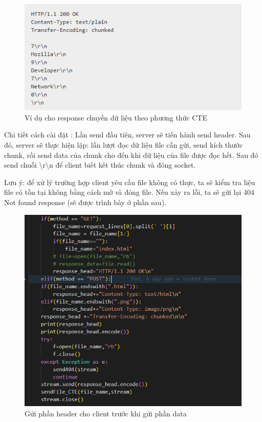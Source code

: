 \documentclass[14pt]{extreport}
\begin{document}
\begin{center}
    \begin{figure}[H]
    \begin{center}
     \includegraphics[scale=.8]{CTE example.PNG}
    \end{center}
    \caption{Ví dụ cho response chuyền dữ liệu theo phương thức CTE\cite{3}}
    \end{figure}
\end{center}

Chi tiết cách cài đặt : Lần send đầu tiên, server sẽ tiến hành send header. Sau đó, server sẽ thực hiện lặp: lần lượt đọc dữ liệu file cần gửi, send kích thước chunk, rồi send data của chunk cho đến khi dữ liệu của file được đọc hết. Sau đó send chuỗi \textbackslash r\textbackslash n để client biết kết thúc chunk và đóng socket.

Lưu ý: để xử lý trường hợp client yêu cầu file không có thực, ta sẽ kiểm tra liệu file có tồn tại không bằng cách mở và đóng file. Nếu xảy ra lỗi, ta sẽ gửi lại 404 Not found response (sẽ được trình bày ở phần sau).
\begin{center}
    \begin{figure}[H]
    \begin{center}
     \includegraphics[scale=1.0]{GET implement.PNG}
    \end{center}
    \caption{Gửi phần header cho client trước khi gửi phần data}
    \end{figure}
\end{center}
\end{document}
